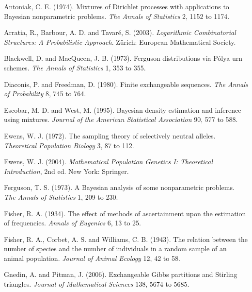\begin{thebibliography}{}

Antoniak, C. E. (1974). Mixtures of Dirichlet processes with applications to Bayesian
nonparametric problems. \textit{The Annals of Statistics} 2, 1152 to 1174.

Arratia, R., Barbour, A. D. and Tavar\'e, S. (2003). \textit{Logarithmic Combinatorial
Structures: A Probabilistic Approach}. Z\"urich: European Mathematical Society.

Blackwell, D. and MacQueen, J. B. (1973). Ferguson distributions via P\'olya urn
schemes. \textit{The Annals of Statistics} 1, 353 to 355.

Diaconis, P. and Freedman, D. (1980). Finite exchangeable sequences. \textit{The Annals
of Probability} 8, 745 to 764.

Escobar, M. D. and West, M. (1995). Bayesian density estimation and inference using
mixtures. \textit{Journal of the American Statistical Association} 90, 577 to 588.

Ewens, W. J. (1972). The sampling theory of selectively neutral alleles.
\textit{Theoretical Population Biology} 3, 87 to 112.

Ewens, W. J. (2004). \textit{Mathematical Population Genetics I: Theoretical
Introduction}, 2nd ed. New York: Springer.

Ferguson, T. S. (1973). A Bayesian analysis of some nonparametric problems.
\textit{The Annals of Statistics} 1, 209 to 230.

Fisher, R. A. (1934). The effect of methods of ascertainment upon the estimation of
frequencies. \textit{Annals of Eugenics} 6, 13 to 25.

Fisher, R. A., Corbet, A. S. and Williams, C. B. (1943). The relation between the
number of species and the number of individuals in a random sample of an animal
population. \textit{Journal of Animal Ecology} 12, 42 to 58.

Gnedin, A. and Pitman, J. (2006). Exchangeable Gibbs partitions and Stirling
triangles. \textit{Journal of Mathematical Sciences} 138, 5674 to 5685.


\end{thebibliography}
